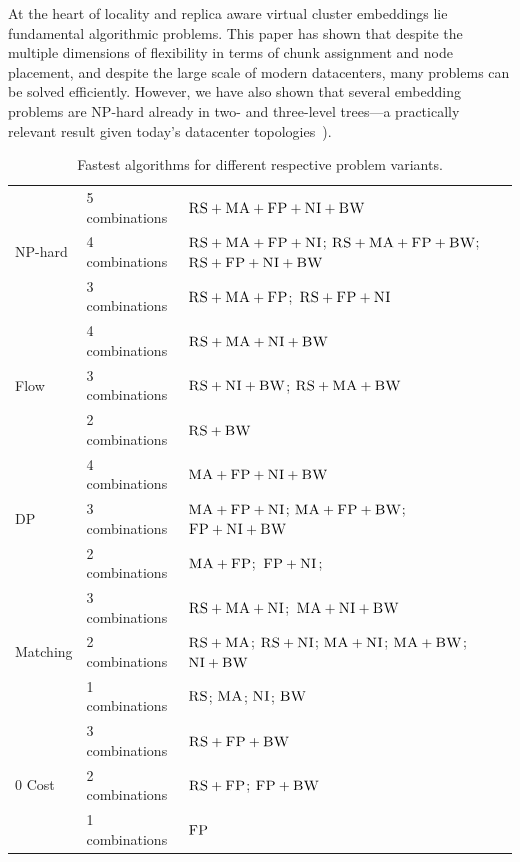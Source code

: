 At the heart of locality and replica aware virtual cluster embeddings lie fundamental algorithmic problems.
This paper has shown that despite the
multiple dimensions of flexibility in terms of chunk assignment and node placement, 
and despite the large scale of modern datacenters, 
many problems can be solved efficiently. However, we have also
shown that several embedding problems are NP-hard already in two-
and three-level trees---a practically relevant result given today's datacenter topologies~\cite{fattree}).
\begin{table}
\tiny
\bgroup
\def\arraystretch{1.5}
\begin{small}
\begin{tabular}{|l|l|p{6.5cm}|}
\hline
\multirow{3}{*}{NP-hard} & 5 combinations & \mbox{$\textsc{RS}+\textsc{MA}+\textsc{FP}+\textsc{NI}+\textsc{BW}$}\\
\cline{2-3}
 & 4 combinations &  \mbox{$\textsc{RS}+\textsc{MA}+\textsc{FP}+\textsc{NI}$}; \mbox{$\textsc{RS}+\textsc{MA}+\textsc{FP}+\textsc{BW}$};
\mbox{$\textsc{RS}+\textsc{FP}+\textsc{NI}+\textsc{BW}$} \\ \cline{2-3}
 & 3 combinations &\mbox{$\textsc{RS}+\textsc{MA}+\textsc{FP}$};~\mbox{$\textsc{RS}+\textsc{FP}+\textsc{NI}$} \\
 \hline
 \hline
\multirow{3}{*}{Flow} & 4 combinations & \mbox{$\textsc{RS}+\textsc{MA}+\textsc{NI}+\textsc{BW}$} \\ \cline{2-3}
 & 3 combinations & \mbox{$\textsc{RS}+\textsc{NI}+\textsc{BW}$}; \mbox{$\textsc{RS}+\textsc{MA}+\textsc{BW}$}    \\ \cline{2-3}
 & 2 combinations &$\textsc{RS}+\textsc{BW}$ \\
 \hline
 \hline
\multirow{3}{*}{DP} & 4 combinations & \mbox{$\textsc{MA}+\textsc{FP}+\textsc{NI}+\textsc{BW}$} \\ \cline{2-3}
 & 3 combinations &   \mbox{$\textsc{MA}+\textsc{FP}+\textsc{NI}$};
\mbox{$\textsc{MA}+\textsc{FP}+\textsc{BW}$}; \mbox{$\textsc{FP}+\textsc{NI}+\textsc{BW}$} \\ \cline{2-3}
 & 2 combinations & \mbox{$\textsc{MA}+\textsc{FP}$};~\mbox{$\textsc{FP}+\textsc{NI}$}; \\
 \hline
 \hline
\multirow{3}{*}{Matching} &3 combinations&
\mbox{$\textsc{RS}+\textsc{MA}+\textsc{NI}$};~\mbox{$\textsc{MA}+\textsc{NI}+\textsc{BW}$}  \\
\cline{2-3}
 & 2 combinations & \mbox{$\textsc{RS}+\textsc{MA}$};
\mbox{$\textsc{RS}+\textsc{NI}$}; \mbox{$\textsc{MA}+\textsc{NI}$};
\mbox{$\textsc{MA}+\textsc{BW}$}; \mbox{$\textsc{NI}+\textsc{BW}$} \\ \cline{2-3}
& 1 combinations & \mbox{$\textsc{RS}$}; \mbox{$\textsc{MA}$};
\mbox{$\textsc{NI}$}; \mbox{$\textsc{BW}$}\\
 \hline
 \hline
 \multirow{3}{*}{0 Cost} & 3 combinations & \mbox{$\textsc{RS}+\textsc{FP}+\textsc{BW}$}\\
\cline{2-3}
 & 2 combinations & \mbox{$\textsc{RS}+\textsc{FP}$}; \mbox{$\textsc{FP}+\textsc{BW}$}\\ \cline{2-3}
 & 1 combinations & \mbox{$\textsc{FP}$}\\
 \hline
\end{tabular}
\end{small}
\caption{
Fastest algorithms for different respective problem variants.
}
\vspace{-2em}
\label{tab:summary}
\egroup
\end{table}


